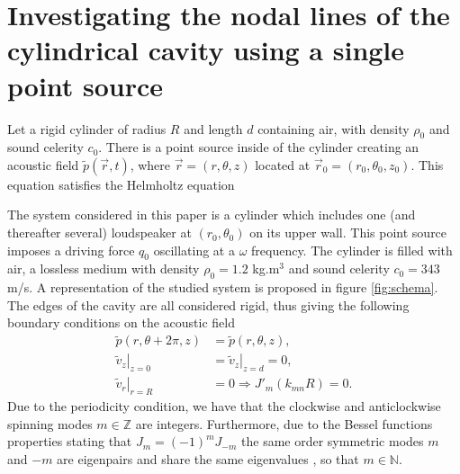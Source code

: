 \documentclass[%
 reprint,
 amsmath,amssymb,
 aip,
]{revtex4-1}
\begin{document}
\section{Investigating the nodal lines of the cylindrical cavity using a single point source}

Let a rigid cylinder of radius $R$ and length $d$ containing air, with density $\rho_0$ and sound celerity $c_0$. There is a point source inside of the cylinder creating an acoustic field $\tilde{p}(\vec{r}, t)$, where $\vec{r} = (r, \theta, z)$ located at $\vec{r}_0 = (r_0, \theta_0, z_0)$. This equation satisfies the Helmholtz equation

The system considered in this paper is a cylinder which includes one (and thereafter several) loudspeaker at $(r_0, \theta_0)$ on its upper wall. This point source imposes a driving force $q_0$ oscillating at a $\omega$ frequency. The cylinder is filled with air, a lossless medium with density $\rho_0 = 1.2$ kg.m$^3$ and sound celerity $c_0 = 343$ m/s. A representation of the studied system is proposed in figure \ref{fig:schema}. The edges of the cavity are all considered rigid, thus giving the following boundary conditions on the acoustic field
\begin{equation}
   \begin{split}
       \tilde{p}(r, \theta + 2 \pi , z) &= \tilde{p}(r, \theta, z),\\
       \left. \tilde{v}_z \right|_{z=0} & = \left. \tilde{v}_z \right|_{z=d} = 0,\\
               \left. \tilde{v}_r \right|_{r=R} & = 0 \Rightarrow J'_m (k_{mn}R) = 0.
   \end{split} 
\end{equation}
Due to the periodicity condition, we have that the clockwise and anticlockwise spinning modes $m \in \mathbb{Z}$ are integers. Furthermore, due to the Bessel functions properties stating that $J_m = (-1)^m J_{-m}$ the same order symmetric modes $m$ and $-m$ are eigenpairs and share the same eigenvalues \cite{rona2007}, so that $m \in \mathbb{N}$.
\end{document}

